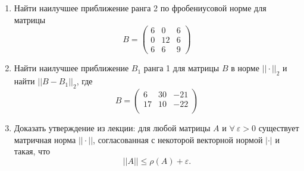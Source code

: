 \documentclass[12pt]{article}
\theoremstyle{definition}
\numberwithin{equation}{section}
\begin{document}
	\begin{enumerate}
		\item
		Найти наилучшее приближение ранга 2 по фробениусовой норме для матрицы 
		\[B = \begin{pmatrix}
		6 & 0 & 6\\
		0 & 12 & 6\\
		6 & 6 & 9
		\end{pmatrix}\]
		
		\item Найти наилучшее приближение $B_1$ ранга 1 для матрицы $B$ в норме $||\cdot||_2$ и найти $||B-B_1||_2$, где
		\[B = \begin{pmatrix}
		6 & 30 & -21\\
		17 & 10 & -22\\
		\end{pmatrix}\]
		
		\item Доказать утверждение из лекции: для любой матрицы $A$ и $\forall~ \varepsilon>0$ существует матричная норма $||\cdot ||$, согласованная с некоторой векторной нормой $|\cdot|$ и такая, что $$||A||\leqslant \rho(A) + \varepsilon .$$
	\end{enumerate}
	
\end{document}
